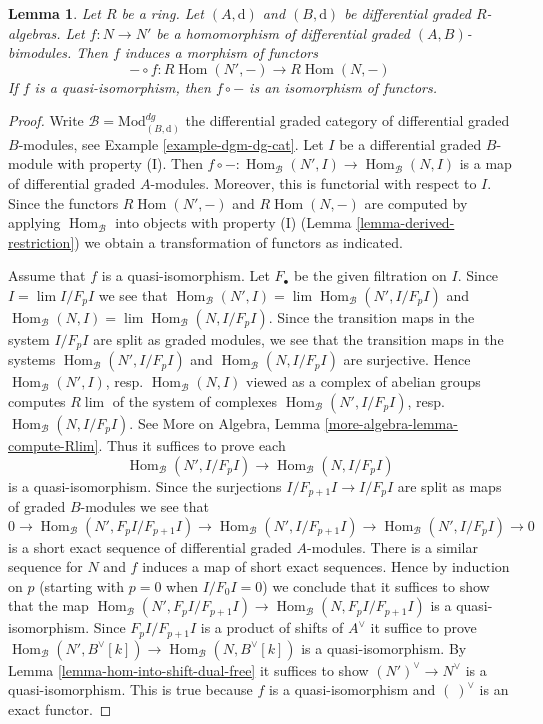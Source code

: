 \documentclass{stacks-project}
\theoremstyle{plain}
\newtheorem{lemma}[subsection]{Lemma}
\theoremstyle{definition}
\theoremstyle{remark}
\numberwithin{equation}{subsection}
\def\lim{\mathop{\mathrm{lim}}\nolimits}
\def\Hom{\mathop{\mathrm{Hom}}\nolimits}
\begin{document}
\begin{lemma}
\label{lemma-functoriality-derived-restriction}
Let $R$ be a ring. Let $(A, \text{d})$ and $(B, \text{d})$ be
differential graded $R$-algebras. Let $f : N \to N'$ be a
homomorphism of differential graded $(A, B)$-bimodules.
Then $f$ induces a morphism of functors
$$
- \circ f : R\Hom(N', -) \longrightarrow R\Hom(N, -)
$$
If $f$ is a quasi-isomorphism, then $f \circ -$ is an isomorphism of
functors.
\end{lemma}

\begin{proof}
Write $\mathcal{B} = \text{Mod}^{dg}_{(B, \text{d})}$ the
differential graded category of differential graded $B$-modules, see
Example \ref{example-dgm-dg-cat}.
Let $I$ be a differential graded $B$-module with property (I).
Then $f \circ - : \Hom_\mathcal{B}(N', I) \to \Hom_\mathcal{B}(N, I)$
is a map of differential graded $A$-modules. Moreover, this is functorial
with respect to $I$. Since the functors
$ R\Hom(N', -)$ and $R\Hom(N, -)$ are
computed by applying $\Hom_\mathcal{B}$ into objects with property (I)
(Lemma \ref{lemma-derived-restriction}) we obtain a transformation of functors
as indicated.

\medskip\noindent
Assume that $f$ is a quasi-isomorphism. Let $F_\bullet$ be the
given filtration on $I$. Since $I = \lim I/F_pI$ we see that
$\Hom_\mathcal{B}(N', I) = \lim \Hom_\mathcal{B}(N', I/F_pI)$ and
$\Hom_\mathcal{B}(N, I) = \lim \Hom_\mathcal{B}(N, I/F_pI)$.
Since the transition maps in the system $I/F_pI$ are split
as graded modules, we see that the transition maps in the
systems $\Hom_\mathcal{B}(N', I/F_pI)$ and $\Hom_\mathcal{B}(N, I/F_pI)$
are surjective. Hence $\Hom_\mathcal{B}(N', I)$, resp. $\Hom_\mathcal{B}(N, I)$
viewed as a complex of abelian groups computes $R\lim$ of the system
of complexes
$\Hom_\mathcal{B}(N', I/F_pI)$, resp. $\Hom_\mathcal{B}(N, I/F_pI)$.
See More on Algebra, Lemma \ref{more-algebra-lemma-compute-Rlim}.
Thus it suffices to prove each
$$
\Hom_\mathcal{B}(N', I/F_pI) \to \Hom_\mathcal{B}(N, I/F_pI)
$$
is a quasi-isomorphism. Since the surjections $I/F_{p + 1}I \to I/F_pI$
are split as maps of graded $B$-modules we see that
$$
0 \to \Hom_\mathcal{B}(N', F_pI/F_{p + 1}I) \to
\Hom_\mathcal{B}(N', I/F_{p + 1}I) \to
\Hom_\mathcal{B}(N', I/F_pI) \to 0
$$
is a short exact sequence of differential graded $A$-modules.
There is a similar sequence for $N$ and $f$ induces a map
of short exact sequences. Hence by induction on $p$ (starting with $p = 0$
when $I/F_0I = 0$) we conclude that it suffices to show that
the map
$\Hom_\mathcal{B}(N', F_pI/F_{p + 1}I) \to \Hom_\mathcal{B}(N, F_pI/F_{p + 1}I)$
is a quasi-isomorphism. Since $F_pI/F_{p + 1}I$ is a product of shifts of
$A^\vee$ it suffice to prove
$\Hom_\mathcal{B}(N', B^\vee[k]) \to \Hom_\mathcal{B}(N, B^\vee[k])$
is a quasi-isomorphism. By Lemma \ref{lemma-hom-into-shift-dual-free}
it suffices to show $(N')^\vee \to N^\vee$ is a quasi-isomorphism.
This is true because $f$ is a quasi-isomorphism and $(\ )^\vee$
is an exact functor.
\end{proof}
\end{document}
